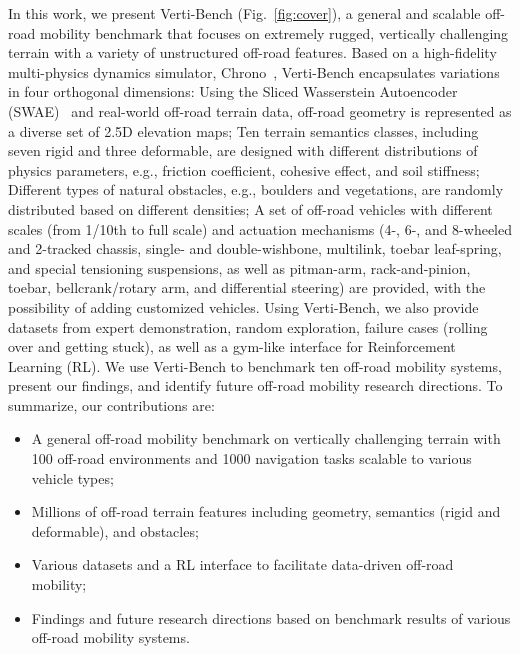 In this work, we present Verti-Bench (Fig.~\ref{fig:cover}), a general and scalable off-road mobility benchmark that focuses on extremely rugged, vertically challenging terrain with a variety of unstructured off-road features. Based on a high-fidelity multi-physics dynamics simulator, Chrono~\cite{tasora2016chrono}, Verti-Bench encapsulates variations in four orthogonal dimensions: Using the Sliced Wasserstein Autoencoder (SWAE)~\cite{kolouri2018sliced} and real-world off-road terrain data, off-road geometry is represented as a diverse set of 2.5D elevation maps; Ten terrain semantics classes, including seven rigid and three deformable, are designed with different distributions of physics parameters, e.g., friction coefficient, cohesive effect, and soil stiffness; Different types of natural obstacles, e.g., boulders and vegetations, are randomly distributed based on different densities; A set of off-road vehicles with different scales (from 1/10th to full scale) and actuation mechanisms (4-, 6-, and 8-wheeled and 2-tracked chassis, single- and double-wishbone, multilink, toebar leaf-spring, and special tensioning suspensions, as well as pitman-arm, rack-and-pinion, toebar, bellcrank/rotary arm, and differential steering) are provided, with the possibility of adding customized vehicles. Using Verti-Bench, we also provide datasets from expert demonstration, random exploration, failure cases (rolling over and getting stuck), as well as a gym-like interface for Reinforcement Learning (RL). We use Verti-Bench to benchmark ten off-road mobility systems, present our findings, and identify future off-road mobility research directions. To summarize, our contributions are: 
\begin{itemize}
    \item A general off-road mobility benchmark on vertically challenging terrain with 100 off-road environments and 1000 navigation tasks scalable to various vehicle types;
    \item Millions of off-road terrain features including geometry, semantics (rigid and deformable), and obstacles;
    \item Various datasets and a RL interface to facilitate data-driven off-road mobility;
    \item Findings and future research directions based on benchmark results of various off-road mobility systems.  
\end{itemize}

